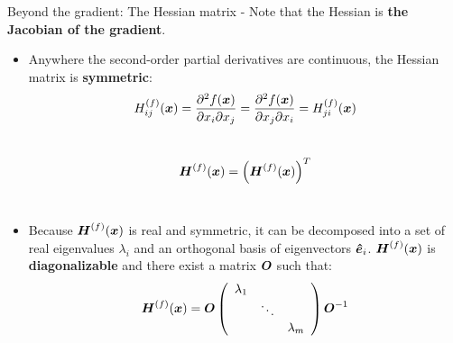 \begin{frame}[t,allowframebreaks]{
    Beyond the gradient: The Hessian matrix -}
    Note that the \gls{Hessian} is {\bf the \gls{Jacobian} of the gradient}.

    \framebreak


    \begin{itemize}
        \item 
        Anywhere the second-order partial derivatives are continuous,
        the \gls{Hessian matrix} is {\bf symmetric}:
        \begin{equation}
            H^{(f)}_{ij}(\boldsymbol{x}) = 
              \frac{\partial^2 f(\boldsymbol{x})}{\partial x_i \partial x_j} =
              \frac{\partial^2 f(\boldsymbol{x})}{\partial x_j \partial x_i} =
              H^{(f)}_{ji}(\boldsymbol{x}) 
            \label{eq:hessian_symmetric_1}
         \end{equation}\\
         \begin{equation}
              \boldsymbol{H}^{(f)}(\boldsymbol{x}) = \Big( \boldsymbol{H}^{(f)}(\boldsymbol{x}) \Big)^T
            \label{eq:hessian_symmetric_2}
         \end{equation}\\
    
        \item 
        Because $\boldsymbol{H}^{(f)}(\boldsymbol{x})$ is real and symmetric,
        it can be decomposed into a set of real 
        \glspl{eigenvalue} $\lambda_{i}$
        and an orthogonal basis of 
        \glspl{eigenvector} $\boldsymbol{\hat{e}}_i$.
        $\boldsymbol{H}^{(f)}(\boldsymbol{x})$ is {\bf diagonalizable} and
        there exist a matrix $\boldsymbol{O}$ such that:
        \begin{equation}
            \boldsymbol{H}^{(f)}(\boldsymbol{x}) = 
            \boldsymbol{O}
            \left(
                \begin{array}{ccc}
                    \lambda_1 &        & \\
                              & \ddots & \\
                              &        & \lambda_m \\                              
                \end{array}
            \right)
            \boldsymbol{O}^{-1}
          \label{eq:hessian_diag_1}
       \end{equation}\\
    \end{itemize}

    \framebreak


\end{frame}
